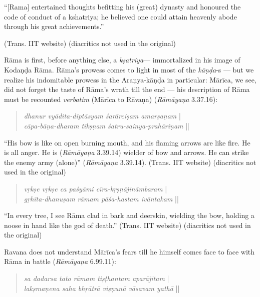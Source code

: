 \begin{myquote}
“[Rama] entertained thoughts befitting his (great) dynasty and honoured the code of conduct of a kshatriya; he believed one could attain heavenly abode through his great achievements.”

\hfill (Trans. IIT website) (diacritics not used in the original)
\end{myquote}

Rāma is first, before anything else, a {\sl kṣatriya}--- immortalized in his image of Kodaṇḍa Rāma. Rāma’s prowess comes to light in most of the {\sl kāṇḍa}-s --- but we realize his indomitable prowess in the Araṇya-kāṇḍa in particular: Mārīca, we see, did not forget the taste of Rāma’s wrath till the end --- his description of Rāma must be recounted {\sl verbatim} (Mārīca to Rāvaṇa) ({\sl Rāmāyaṇa} 3.37.16): 
\begin{quote}
{{\sl dhanur vyādita-dīptāsyam śarārciṣam amarṣaṇam}} |\\
{\sl cāpa-bāṇa-dharam tīkṣṇam śatru-sainya-prahāriṇam} ||
\end{quote}

\begin{myquote}
“His bow is like on open burning mouth, and his flaming arrows are like fire. He is all anger. He is ({\sl Rāmāyaṇa} 3.39.14) wielder of bow and arrows. He can strike the enemy army (alone)” ({\sl Rāmāyaṇa} 3.39.14). (Trans. IIT website) (diacritics not used in the original) 
\end{myquote}

\begin{quote}
{{\sl vṛkṣe vṛkṣe ca paśyāmi cīra-kṛṣṇājināmbaram}} |\\
{\sl gṛhīta-dhanuṣam rāmam pāśa-hastam ivāntakam} || 
\end{quote}

\begin{myquote}
“In every tree, I see Rāma clad in bark and deerskin, wielding the bow, holding a noose in hand like the god of death.” (Trans. IIT website) (diacritics not used in the original)
\end{myquote}

Ravana does not understand Mārīca’s fears till he himself comes face to face with Rāma in battle ({\sl Rāmāyaṇa} 6.99.11): 

\begin{quote}
{{\sl sa dadarsa tato rāmam tiṣṭhantam aparājitam}} |\\
{\sl lakṣmaṇena saha bhṛātrā viṣṇunā vāsavam yathā} || 
\end{quote}

